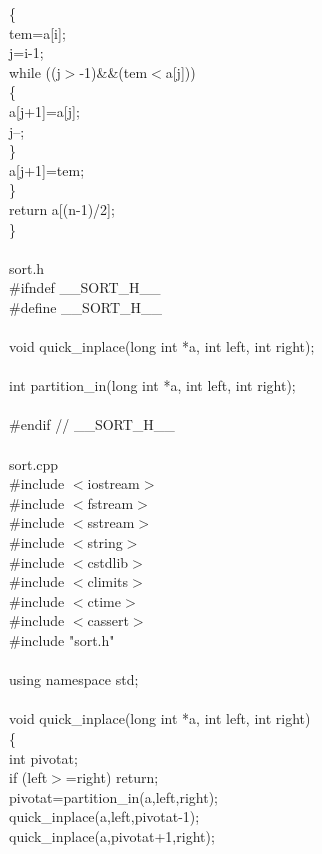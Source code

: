 \documentclass{article}
\begin{document}
    \{\\
        tem=a[i];\\
        j=i-1;\\
        while ((j$>$-1)\&\&(tem$<$a[j]))\\
        \{\\
            a[j+1]=a[j];\\
            j--;\\
        \}\\
        a[j+1]=tem;\\
    \}\\
    return a[(n-1)/2];\\
\}\\
\\
sort.h\\
\#ifndef \_\_SORT\_H\_\_\\
\#define \_\_SORT\_H\_\_\\
\\
void quick\_inplace(long int *a, int left, int right);\\
\\
int partition\_in(long int *a, int left, int right);\\
\\
\#endif // \_\_SORT\_H\_\_\\
\\
sort.cpp\\
\#include $<$iostream$>$\\
\#include $<$fstream$>$\\
\#include $<$sstream$>$\\
\#include $<$string$>$\\
\#include $<$cstdlib$>$\\
\#include $<$climits$>$\\
\#include $<$ctime$>$\\
\#include $<$cassert$>$\\
\#include "sort.h"\\
\\
using namespace std;\\
\\
void quick\_inplace(long int *a, int left, int right)\\
\{\\
    int pivotat;\\
    if (left$>$=right) return;\\
    pivotat=partition\_in(a,left,right);\\
    quick\_inplace(a,left,pivotat-1);\\
    quick\_inplace(a,pivotat+1,right);\\
\end{document}
